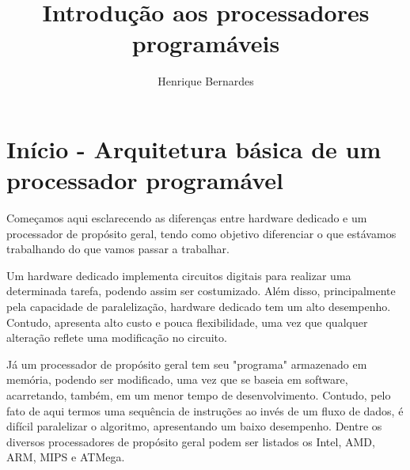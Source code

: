 \documentclass{article}
\begin{document}
\newcommand{\makeboxlabel}[1]{\fbox{#1.}\hfill}%
\newenvironment{boxlabel}
  {\begin{list}
    {\arabic{boxlblcounter}}
    {\usecounter{boxlblcounter}
     \setlength{\labelwidth}{3em}
     \setlength{\labelsep}{0em}
     \setlength{\itemsep}{2pt}
     \setlength{\leftmargin}{1.5cm}
     \setlength{\rightmargin}{2cm}
     \setlength{\itemindent}{0em} 
     \let\makelabel=\makeboxlabel
    }
  }
{\end{list}}

\newenvironment{boxedd}
    {
     \begin{center}
    \begin{tabular}{|p{1\textwidth}|}
    \hline
    }
    { 
    \\\\\hline
    \end{tabular} 
    \end{center}
    }



 

\title{Introdução aos processadores programáveis}
\author{Henrique Bernardes}
\maketitle
\thispagestyle{empty}

\section{Início - Arquitetura básica de um processador programável}
Começamos aqui esclarecendo as diferenças entre hardware dedicado e um processador de propósito geral, tendo como objetivo diferenciar o que estávamos trabalhando do que vamos passar a trabalhar.

Um hardware dedicado implementa circuitos digitais para realizar uma determinada tarefa, podendo assim ser costumizado. Além disso, principalmente pela capacidade de paralelização, hardware dedicado tem um alto desempenho. Contudo, apresenta alto custo e pouca flexibilidade, uma vez que qualquer alteração reflete uma modificação no circuito. 

Já um processador de propósito geral tem seu "programa" armazenado em memória, podendo ser modificado, uma vez que se baseia em software, acarretando, também, em um menor tempo de desenvolvimento. Contudo, pelo fato de aqui termos uma sequência de instruções ao invés de um fluxo de dados, é difícil paralelizar o algoritmo, apresentando um baixo desempenho. Dentre os diversos processadores de propósito geral podem ser listados os Intel, AMD, ARM, MIPS e ATMega.
\end{document}
